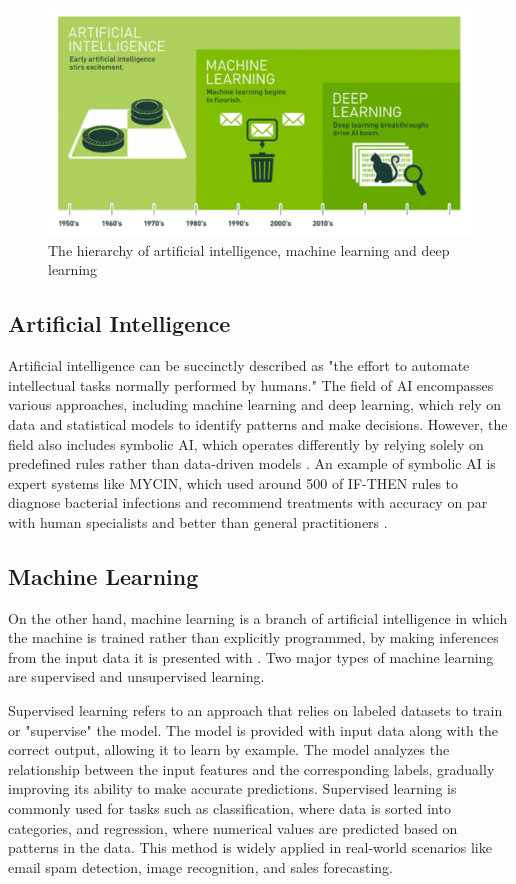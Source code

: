 \documentclass[licencjacka,en]{pracamgr}
\begin{document}
\begin{figure}
    \centering
    \includegraphics[width=0.5\linewidth]{bachelor_images/nvidia_ai_hierarchy.png}
    \caption{The hierarchy of artificial intelligence, machine learning and deep learning \cite{francuz}}
    \label{fig:hierarchy-ai-ml-dl}
\end{figure}

\subsection{Artificial Intelligence}
Artificial intelligence can be succinctly described as "the effort to automate intellectual tasks normally performed by humans." The field of AI encompasses various approaches, including machine learning and deep learning, which rely on data and statistical models to identify patterns and make decisions. However, the field also includes symbolic AI, which operates differently by relying solely on predefined rules rather than data-driven models \cite{francuz}. An example of symbolic AI is expert systems like MYCIN, which used around 500 of IF-THEN rules to diagnose bacterial infections and recommend treatments with accuracy on par with human specialists and better than general practitioners \cite{mycin}.

\subsection{Machine Learning}
On the other hand, machine learning is a branch of artificial intelligence in which the machine is trained rather than explicitly programmed, by making inferences from the input data it is presented with \cite{francuz}. Two major types of machine learning are supervised and unsupervised learning.

Supervised learning refers to an approach that relies on labeled datasets to train or "supervise" the model. The model is provided with input data along with the correct output, allowing it to learn by example. The model analyzes the relationship between the input features and the corresponding labels, gradually improving its ability to make accurate predictions. Supervised learning is commonly used for tasks such as classification, where data is sorted into categories, and regression, where numerical values are predicted based on patterns in the data. This method is widely applied in real-world scenarios like email spam detection, image recognition, and sales forecasting.
\end{document}
